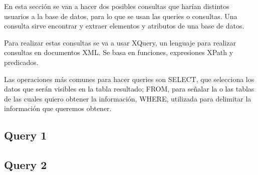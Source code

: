 \documentclass[../main.tex]{subfiles}
\begin{document}
En esta sección se van a hacer dos posibles consultas que harían distintos usuarios a la base de datos, para lo que se usan las queries o consultas. Una consulta sirve encontrar y extraer elementos y atributos de una base de datos.

Para realizar estas consultas se va a usar XQuery, un lenguaje para realizar consultas en documentos XML. Se basa en funciones, expresiones XPath y predicados.

Las operaciones más comunes para hacer queries son SELECT, que selecciona los datos que serán visibles en la tabla resultado; FROM, para señalar la o las tablas de las cuales quiero obtener la información, WHERE, utilizada para delimitar la información que queremos obtener.

\subsection{Query 1}


\subsection{Query 2}
\end{document}
